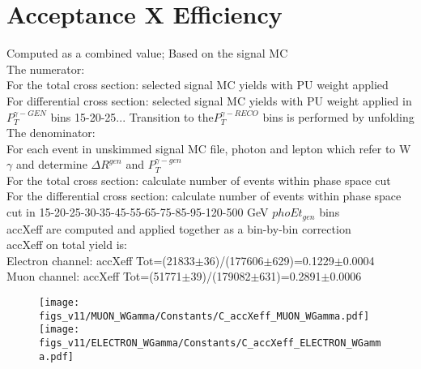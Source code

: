 \section{Acceptance X Efficiency}
\label{sec:AccXEff}

Computed as a combined value; Based on the signal MC\\

The numerator:\\

For the total cross section: selected signal MC yields with PU weight applied\\
For differential cross section: selected signal MC yields with PU weight applied in $P_T^{\gamma-GEN}$ bins 15-20-25... Transition to the$P_T^{\gamma-RECO}$ bins is performed by unfolding\\

The denominator:\\

For each event in unskimmed signal MC file, photon and lepton which refer to W$\gamma$ and determine $\Delta R^{gen}$ and $P_T^{\gamma-gen}$ \\
For the total cross section: calculate number of events within phase space cut\\
For the differential cross section: calculate number of events within phase space cut in 15-20-25-30-35-45-55-65-75-85-95-120-500 GeV $phoEt_{gen}$ bins\\

accXeff are computed and applied together as a bin-by-bin correction\\
accXeff on total yield is:\\
Electron channel: accXeff Tot=(21833$\pm$36)/(177606$\pm$629)=0.1229$\pm$0.0004\\
Muon channel: accXeff Tot=(51771$\pm$39)/(179082$\pm$631)=0.2891$\pm$0.0006\\
\begin{figure}[htb]
  \begin{center}
  \texttt{[image: figs\_v11/MUON\_WGamma/Constants/C\_accXeff\_MUON\_WGamma.pdf]}\texttt{[image: figs\_v11/ELECTRON\_WGamma/Constants/C\_accXeff\_ELECTRON\_WGamma.pdf]}\\
  \label{fig:covMatricesaccXeff_Wg}
  \end{center}
\end{figure}


